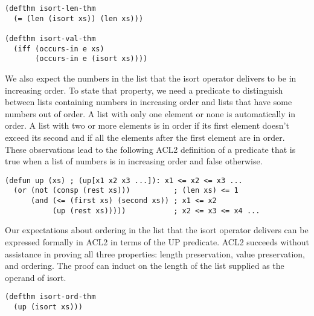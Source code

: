 \label{defthm:isort-len}
\label{defthm:isort-val}
\begin{Verbatim}
(defthm isort-len-thm
  (= (len (isort xs)) (len xs)))

(defthm isort-val-thm
  (iff (occurs-in e xs)
       (occurs-in e (isort xs))))
\end{Verbatim}

We also expect the numbers in the list that the isort operator
delivers to be in increasing order.
To state that property, we need a predicate
to distinguish between lists containing numbers in increasing order
and lists that have some numbers out of order.
A list with only one element or none is automatically in order.
A list with two or more elements is in order
if its first element doesn't exceed its second and if
all the elements after the first element are in order.
These observations lead to the following
ACL2 definition of a predicate that is true when a list
of numbers is in increasing order and false otherwise.

\label{defun:up}
\begin{Verbatim}
(defun up (xs) ; (up[x1 x2 x3 ...]): x1 <= x2 <= x3 ...
  (or (not (consp (rest xs)))          ; (len xs) <= 1
      (and (<= (first xs) (second xs)) ; x1 <= x2
           (up (rest xs)))))           ; x2 <= x3 <= x4 ...
\end{Verbatim}

Our expectations about ordering in the list that the isort operator
delivers can be expressed formally in ACL2 in terms of the UP predicate.
ACL2 succeeds without assistance in proving
all three properties: length preservation,
value preservation, and ordering.
The proof can induct on the length
of the list supplied as the operand of isort.

\label{defthm:isort-ord-thm}
\begin{Verbatim}
(defthm isort-ord-thm
  (up (isort xs)))
\end{Verbatim}

